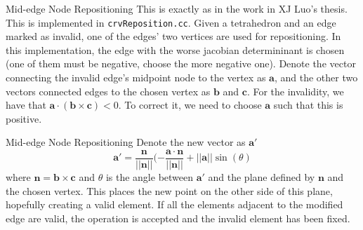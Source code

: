 \documentclass[12pt]{beamer}
\newcommand{\spa}{\vspace{0.5cm}\newline}
\begin{document}
\begin{frame}{Mid-edge Node Repositioning}
This is exactly as in the work in XJ Luo's thesis. This is implemented in \texttt{crvReposition.cc}. Given a tetrahedron and an edge marked as invalid, one of the edges' two vertices are used for repositioning. In this implementation, the edge with the worse jacobian determininant is chosen (one of them must be negative, choose the more negative one). \spa
Denote the vector connecting the invalid edge's midpoint node to the vertex as $\mathbf{a}$, and the other two vectors connected edges to the chosen vertex as $\mathbf{b}$ and $\mathbf{c}$. For the invalidity, we have that $\mathbf{a}\cdot (\mathbf{b}\times\mathbf{c}) < 0$. To correct it, we need to choose $\mathbf{a}$ such that this is positive.
\end{frame}
\begin{frame}{Mid-edge Node Repositioning} 
Denote the new vector as $\mathbf{a}'$ 
\[
\mathbf{a}' = \frac{\mathbf{n}}{||\mathbf{n}||}(-\frac{\mathbf{a}\cdot \mathbf{n}}{||\mathbf{n}||} + ||\mathbf{a}||\sin(\theta)
\]
where $\mathbf{n} = \mathbf{b}\times\mathbf{c} $ and $\theta$ is the angle between $\mathbf{a}'$ and the plane defined by $\mathbf{n}$ and the chosen vertex. This places the new point on the other side of this plane, hopefully creating a valid element. If all the elements adjacent to the modified edge are valid, the operation is accepted and the invalid element has been fixed.
\end{frame}
\end{document}
